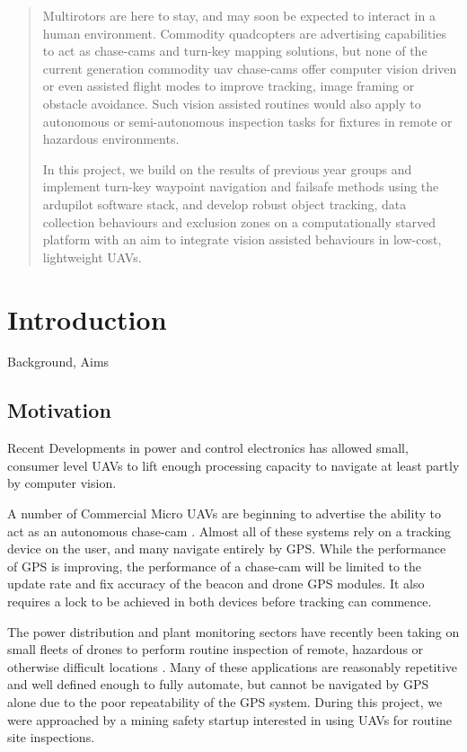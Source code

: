 \documentclass[a4paper, 11pt, titlepage]{article}
\begin{document}
  

  \begin{abstract}
Multirotors are here to stay, and may soon be expected to interact in a human environment.
Commodity quadcopters are advertising capabilities to act as  chase-cams and turn-key mapping solutions, but none of the current generation commodity uav chase-cams offer computer vision driven or even assisted flight modes to improve tracking, image framing or obstacle avoidance.  Such vision assisted routines would also apply to autonomous or semi-autonomous inspection tasks for fixtures in remote or hazardous environments.

In this project, we build on the results of previous year groups and implement turn-key waypoint navigation and failsafe methods using the ardupilot software stack, and develop robust object tracking, data collection behaviours and exclusion zones on a computationally starved platform with an aim to integrate vision assisted behaviours in low-cost, lightweight UAVs.

  \end{abstract}

  \tableofcontents
  \pagebreak
  \section{Introduction}
    Background, Aims

    \subsection{Motivation}
      Recent Developments in power and control electronics has allowed small, consumer level UAVs to lift enough processing capacity to navigate at least partly by computer vision.

      A number of Commercial Micro UAVs are beginning to advertise the ability to act as an autonomous chase-cam \cite{Lily} \cite{AirDog}.  Almost all of these systems rely on a tracking device on the user, and many navigate entirely by GPS.  While the performance of GPS is improving, the performance of a chase-cam will be limited to the update rate and fix accuracy of the beacon and drone GPS modules.  It also requires a lock to be achieved in both devices before tracking can commence.

      The power distribution and plant monitoring sectors have recently been taking on small fleets of drones to perform routine inspection of remote, hazardous or otherwise difficult locations \cite{RopeAccess}.  Many of these applications are reasonably repetitive and well defined enough to fully automate, but cannot be navigated by GPS alone due to the poor repeatability of the GPS system.
      During this project, we were approached by a mining safety startup interested in using UAVs for routine site inspections.
\end{document}

